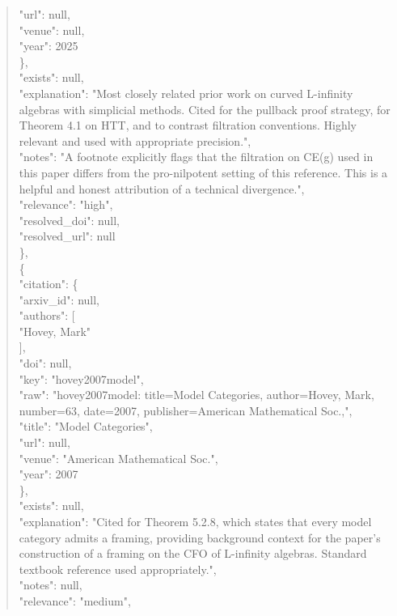 \documentclass[11pt]{article}
\begin{document}
\begin{quote}
        "url": null,\\
        "venue": null,\\
        "year": 2025\\
      \},\\
      "exists": null,\\
      "explanation": "Most closely related prior work on curved L-infinity algebras with simplicial methods. Cited for the pullback proof strategy, for Theorem 4.1 on HTT, and to contrast filtration conventions. Highly relevant and used with appropriate precision.",\\
      "notes": "A footnote explicitly flags that the filtration on CE(g) used in this paper differs from the pro-nilpotent setting of this reference. This is a helpful and honest attribution of a technical divergence.",\\
      "relevance": "high",\\
      "resolved\_doi": null,\\
      "resolved\_url": null\\
    \},\\
    \{\\
      "citation": \{\\
        "arxiv\_id": null,\\
        "authors": [\\
          "Hovey, Mark"\\
        ],\\
        "doi": null,\\
        "key": "hovey2007model",\\
        "raw": "hovey2007model: title=Model Categories, author=Hovey, Mark, number=63, date=2007, publisher=American Mathematical Soc.,",\\
        "title": "Model Categories",\\
        "url": null,\\
        "venue": "American Mathematical Soc.",\\
        "year": 2007\\
      \},\\
      "exists": null,\\
      "explanation": "Cited for Theorem 5.2.8, which states that every model category admits a framing, providing background context for the paper's construction of a framing on the CFO of L-infinity algebras. Standard textbook reference used appropriately.",\\
      "notes": null,\\
      "relevance": "medium",\\

\end{quote}
\end{document}
